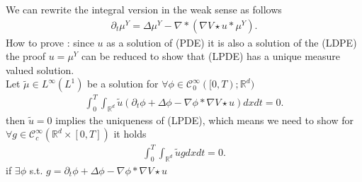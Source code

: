 We can rewrite the integral version in the weak sense as follows
\begin{align*}
  \partial_t \mu ^{Y} = \Delta \mu ^{Y}   - \nabla * (\nabla V \star  u * \mu ^{Y} )
.\end{align*}
How to prove : 
since $u$ as a solution of (PDE) it is also a solution of the (LDPE) 
the proof $u = \mu ^{Y}$ can be reduced to show that (LPDE) has a unique measure valued solution.\\
Let $\tilde{\mu } \in  L^{\infty}(L^{1} )  $ be a solution for $\forall \phi  \in  \mathcal{C}_0^{\infty}([0,T);\mathbb{R}^{d} ) $
\begin{align*}
  \int_0^{T} \int_{\mathbb{R}^{d} }  \tilde{u}  (\partial_t \phi  +  \Delta  \phi  - \nabla \phi  * \nabla V \star  u) dx dt = 0
.\end{align*}
then $\tilde{u} = 0 $ implies the uniqueness of (LPDE), which means we need to show for $\forall  g \in  \mathcal{C}_c^{\infty}(\mathbb{R}^{d} \times [0,T] )  $
it holds 
\begin{align*}
  \int_0^{T}  \int_{\mathbb{R}^{d } } \tilde{u}  g dx dt = 0
.\end{align*}
if $\exists  \phi $ s.t. $g = \partial_t \phi  + \Delta  \phi  - \nabla \phi  * \nabla V \star  u$
